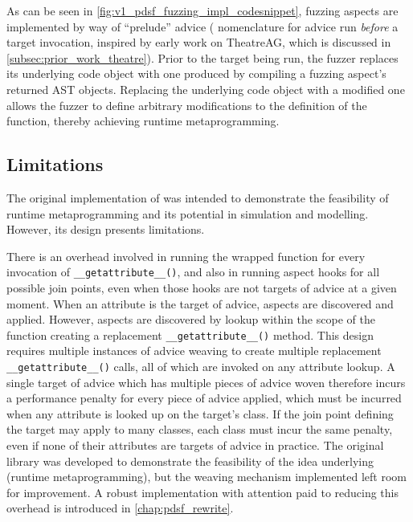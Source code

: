 As can be seen in \cref{fig:v1_pdsf_fuzzing_impl_codesnippet}, fuzzing aspects
are implemented by way of ``prelude'' advice (\pdsf{} nomenclature for advice
run \emph{before} a target invocation, inspired by early work on TheatreAG,
which is discussed in \cref{subsec:prior_work_theatre}). Prior to the target
being run, the fuzzer replaces its underlying code object with one produced by
compiling a fuzzing aspect's returned AST objects. Replacing the underlying code
object with a modified one allows the fuzzer to define arbitrary modifications
to the definition of the function, thereby achieving runtime metaprogramming.


\subsection{Limitations}\label{subsec:prior_work_pdsf_limitations}

The original implementation of \pdsf was intended to demonstrate the feasibility
of runtime metaprogramming and its potential in simulation and modelling.
However, its design presents limitations.

There is an overhead involved in running
the wrapped function for every invocation of \lstinline{__getattribute__()}, and
also in running aspect hooks for all possible join points, even when those hooks
are not targets of advice at a given moment.
When an attribute is the target of advice, aspects are discovered and applied.
However, aspects are discovered by lookup within the scope of the function
creating a replacement \lstinline{__getattribute__()} method. This design
requires multiple instances of advice weaving to create multiple replacement
\lstinline{__getattribute__()} calls, all of which are invoked on any attribute
lookup. A single target of advice which has multiple pieces of advice woven
therefore incurs a performance penalty for every piece of advice applied, which
must be incurred when any attribute is looked up on the target's class. If the
join point defining the target may apply to many classes, each class must incur
the same penalty, even if none of their attributes are targets of advice in
practice. The original library was developed to demonstrate the feasibility of
the idea underlying \pdsf{} (runtime metaprogramming), but the weaving mechanism
implemented left room for improvement. A robust implementation with attention
paid to reducing this overhead is introduced in \cref{chap:pdsf_rewrite}.

